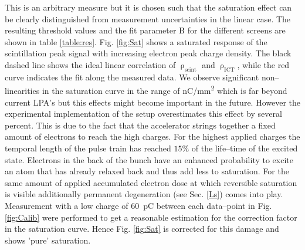 \documentclass[%
preprint,
amsmath,
amssymb,
aip,
rsi, 
numerical,
floatfix,
]{revtex4-1}
\begin{document}
This is an arbitrary measure but it is chosen such that the saturation effect can be clearly distinguished from measurement uncertainties in the linear case. 
The resulting threshold values and the fit parameter B for the different screens are shown in table \ref{table:res}.
Fig. \ref{fig:Sat} shows a saturated response of the scintillation peak signal with increasing electron peak charge density. 
The black dashed line shows the ideal linear correlation of $\uprho_{\text{scint}}$ and $\uprho_{\text{ICT}}$, while the red curve indicates the fit along the measured data. 
We observe significant non--linearities in the saturation curve in the range of \si[per-mode=symbol]{\nano\coulomb \per \square\milli\meter} which is far beyond current LPA's but this effects might become important in the future. 
However the experimental implementation of the setup overestimates this effect by several percent. 
This is due to the fact that the accelerator strings together a fixed amount of electrons to reach the high charges.
For the highest applied charges the temporal length of the pulse train has reached $15\%$ of the life--time of the excited state.
Electrons in the back of the bunch have an enhanced probability to excite an atom that has already relaxed back and thus add less to saturation.
For the same amount of applied accumulated electron dose at which reversible saturation is visible additionally permanent degeneration (see Sec. \ref{Ls}) comes into play.
Measurement with a low charge of \SI{60}{\pico\coulomb} between each data--point in Fig. \ref{fig:Calib} were performed to get a reasonable estimation for the correction factor in the saturation curve.
Hence Fig. \ref{fig:Sat} is corrected for this damage and shows 'pure' saturation.      
\end{document}
